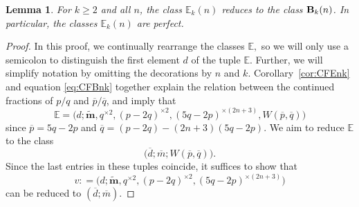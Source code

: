 \documentclass[11pt, reqno]{amsart}
\newtheorem{lemma}[thm]{Lemma}
\theoremstyle{remark}
\numberwithin{equation}{subsection}
\numberwithin{figure}{section}
\theoremstyle{customremark}
\newcommand{\bE}{{\mathbb E}}
\newcommand{\ov}{\overline}
\newcommand{\btm}{\widetilde{\bm{m}}}
\newcommand{\bB}{{\bf{B}}}
\begin{document}
\begin{lemma} \label{lem:classesPerfect}
    For $k \geq 2$ and all $n$, the class $\bE_k(n)$ reduces to the class $\bB_k(n)$. In particular, the classes $\bE_k(n)$ are perfect. 
\end{lemma}
\begin{proof}
In this proof, we continually rearrange the classes $\bE,$ so we will only use a semicolon to distinguish the first element $d$ of the tuple $\bE$. Further, we will simplify notation by omitting the decorations by $n$ and $k$. 
Corollary~\ref{cor:CFEnk} and equation \eqref{eq:CFBnk} together explain the relation between  the continued fractions of $p/q$ and $\ov{p}/\ov{q}$, and imply  that 
\[ \bE=\bigl(d;\btm, q^{\times 2},(p-2q)^{\times 2}, (5q-2p)^{\times (2n+3)}, W(\ov{p},\ov{q})\bigr)
\]
since $\ov{p} = 5q-2p$ and $ \ov{q} = (p-2q) - (2n+3)(5q-2p)$.
We aim to reduce $\bE$ to the class
\[ \bigl(\ov{d};\ov{{m}};W(\ov{p},\ov{q})\bigr).\]
Since the last entries in these tuples coincide, it
suffices to show that $$
v: = \bigl(d;\btm,q^{\times 2},(p-2q)^{\times 2},(5q-2p)^{\times (2n+3)}\bigr)
$$ can be reduced to $(\ov{d};\ov{{m}}).$



\end{proof}
\end{document}
